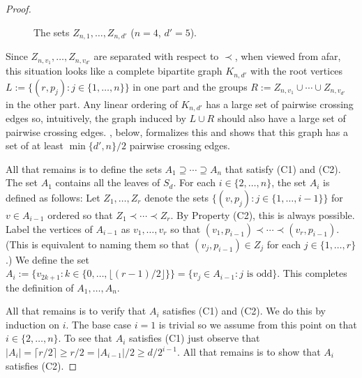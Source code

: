 \documentclass[kpfonts]{patmorin}
\renewcommand{\ge}{\geqslant}
\begin{document}
\begin{proof}
\begin{figure}
\begin{center}
		\end{center}
		\caption{The sets $Z_{n,1},\ldots,Z_{n,d'}$ ($n=4$, $d'=5$).}
	\end{figure}

    Since $Z_{n,v_1},\ldots,Z_{n,v_{d'}}$ are separated with respect to $\prec$, when viewed from afar, this situation looks like a complete bipartite graph $K_{n,d'}$ with the root vertices $L:=\{(r,p_j):j\in\{1,\ldots,n\}\}$ in one part and the groups $R:=Z_{n,v_1}\cup\cdots\cup Z_{n,v_{d'}}$ in the other part.  Any linear ordering of $K_{n,d'}$ has a large set of pairwise crossing edges so, intuitively, the graph induced by $L\cup R$ should also have a large set of pairwise crossing edges. , below, formalizes this and shows that this graph has a set of at least $\min\{d',n\}/2$ pairwise crossing edges.

    All that remains is to define the sets $A_1\supseteq\cdots\supseteq A_n$ that satisfy (C1) and (C2).  The set $A_1$ contains all the leaves of $S_d$.  For each $i\in\{2,\ldots,n\}$, the set $A_i$ is defined as follows:  Let $Z_1,\ldots,Z_r$ denote the sets $\{(v,p_j):j\in\{1,\ldots,i-1\}\}$ for $v\in A_{i-1}$ ordered so that $Z_1\prec\cdots\prec Z_r$.  By Property (C2), this is always possible.	Label the vertices of $A_{i-1}$ as $v_1,\ldots,v_r$ so that $(v_1,p_{i-1})\prec\cdots\prec (v_r,p_{i-1})$.   (This is equivalent to naming them so that $(v_j,p_{i-1})\in Z_j$ for each $j\in\{1,\ldots,r\}$.)  We define the set $A_i:=\{v_{2k+1}:k\in\{0,\ldots,\lfloor(r-1)/2\rfloor\}\}=\{v_{j}\in A_{i-1}:\text{$j$ is odd}\}$.  This completes the definition of $A_1,\ldots,A_n$.

	All that remains is to verify that $A_i$ satisfies (C1) and (C2).  We do this by induction on $i$. The base case $i=1$ is trivial so we assume from this point on that $i\in\{2,\ldots,n\}$.   To see that $A_i$ satisfies (C1) just observe that $|A_i|=\lceil r/2\rceil \ge r/2= |A_{i-1}|/2\ge d/2^{i-1}$.  All that remains is to show that $A_i$ satisfies (C2).


\end{proof}
\end{document}
